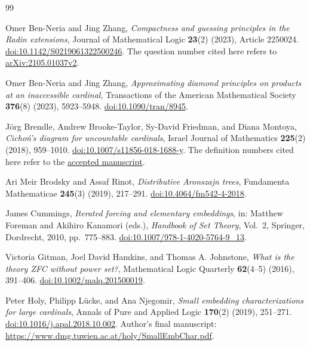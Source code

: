 \documentclass[10pt,a4paper]{amsart}
\theoremstyle{definition}
\theoremstyle{remark}
\begin{document}
\begin{thebibliography}{99}
\raggedright

Omer Ben-Neria and Jing Zhang,
\emph{Compactness and guessing principles in the Radin extensions},
Journal of Mathematical Logic \textbf{23}(2) (2023), Article 2250024.
\href{https://doi.org/10.1142/S0219061322500246}
     {doi:10.1142/S0219061322500246}.
The question number cited here refers to
\href{https://arxiv.org/abs/2105.01037v2}{arXiv:2105.01037v2}.

Omer Ben-Neria and Jing Zhang,
\emph{Approximating diamond principles on products at an
inaccessible cardinal},
Transactions of the American Mathematical Society
\textbf{376}(8) (2023), 5923--5948.
\href{https://doi.org/10.1090/tran/8945}
     {doi:10.1090/tran/8945}.

J\"org Brendle, Andrew Brooke-Taylor, Sy-David Friedman,
and Diana Montoya,
\emph{Cicho\'n's diagram for uncountable cardinals},
Israel Journal of Mathematics \textbf{225}(2) (2018), 959--1010.
\href{https://doi.org/10.1007/s11856-018-1688-y}
     {doi:10.1007/s11856-018-1688-y}.
The definition numbers cited here refer to the
\href{https://eprints.whiterose.ac.uk/id/eprint/118463/1/cichon-large(revised).pdf}
     {accepted manuscript}.

Ari Meir Brodsky and Assaf Rinot,
\emph{Distributive Aronszajn trees},
Fundamenta Mathematicae \textbf{245}(3) (2019), 217--291.
\href{https://doi.org/10.4064/fm542-4-2018}
     {doi:10.4064/fm542-4-2018}.

James Cummings,
\emph{Iterated forcing and elementary embeddings},
in: Matthew Foreman and Akihiro Kanamori (eds.),
\emph{Handbook of Set Theory}, Vol.~2,
Springer, Dordrecht, 2010, pp.~775--883.
\href{https://doi.org/10.1007/978-1-4020-5764-9_13}
     {doi:10.1007/978-1-4020-5764-9\_13}.

Victoria Gitman, Joel David Hamkins, and Thomas A. Johnstone,
\emph{What is the theory ZFC without power set?},
Mathematical Logic Quarterly \textbf{62}(4--5) (2016), 391--406.
\href{https://doi.org/10.1002/malq.201500019}
     {doi:10.1002/malq.201500019}.

Peter Holy, Philipp L\"ucke, and Ana Njegomir,
\emph{Small embedding characterizations for large cardinals},
Annals of Pure and Applied Logic \textbf{170}(2) (2019), 251--271.
\href{https://doi.org/10.1016/j.apal.2018.10.002}
     {doi:10.1016/j.apal.2018.10.002}.
Author's final manuscript:
\url{https://www.dmg.tuwien.ac.at/holy/SmallEmbChar.pdf}.


\end{thebibliography}
\end{document}
